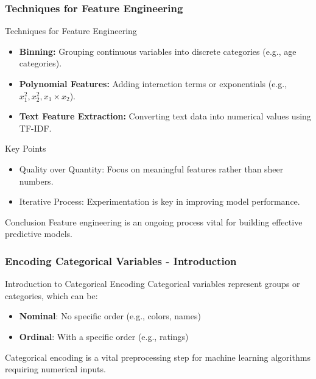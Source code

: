 \documentclass[aspectratio=169]{beamer}
\begin{document}
\begin{frame}[fragile]
    \frametitle{Techniques for Feature Engineering}
    \begin{block}{Techniques for Feature Engineering}
        \begin{itemize}
            \item \textbf{Binning:} Grouping continuous variables into discrete categories (e.g., age categories).
            \item \textbf{Polynomial Features:} Adding interaction terms or exponentials (e.g., \( x_1^2, x_2^2, x_1 \times x_2 \)).
            \item \textbf{Text Feature Extraction:} Converting text data into numerical values using TF-IDF.
        \end{itemize}
    \end{block}
    
    \begin{block}{Key Points}
        \begin{itemize}
            \item Quality over Quantity: Focus on meaningful features rather than sheer numbers.
            \item Iterative Process: Experimentation is key in improving model performance.
        \end{itemize}
    \end{block}
    
    \begin{block}{Conclusion}
        Feature engineering is an ongoing process vital for building effective predictive models.
    \end{block}
\end{frame}

\begin{frame}[fragile]
  \frametitle{Encoding Categorical Variables - Introduction}
  \begin{block}{Introduction to Categorical Encoding}
    Categorical variables represent groups or categories, which can be:
    \begin{itemize}
        \item \textbf{Nominal}: No specific order (e.g., colors, names)
        \item \textbf{Ordinal}: With a specific order (e.g., ratings)
    \end{itemize}
    Categorical encoding is a vital preprocessing step for machine learning algorithms requiring numerical inputs.
  \end{block}
\end{frame}
\end{document}
